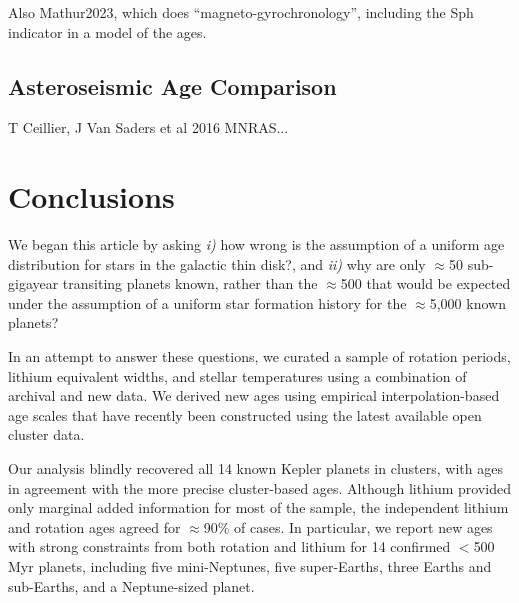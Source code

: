 \documentclass[11pt,twocolumn,tighten]{aastex63}
\begin{document}
Also Mathur2023, which does ``magneto-gyrochronology'', including the
Sph indicator in a model of the ages.


\subsection{Asteroseismic Age Comparison}
T Ceillier, J Van Saders et al 2016 MNRAS...


\section{Conclusions}
\label{sec:conclusions}

We began this article by asking {\it i)} how wrong is the assumption
of a uniform age distribution for stars in the galactic thin disk?,
and {\it ii)} why are only $\approx$50 sub-gigayear transiting planets
known, rather than the $\approx$500 that would be expected under the 
assumption of a uniform star formation history for
the $\approx$5{,}000 known planets?

In an attempt to answer these questions, we curated a sample of rotation
periods, lithium equivalent widths, and stellar temperatures using a combination
of archival and new data.
We derived new ages using empirical interpolation-based age scales
that have recently been constructed using the latest available open cluster data.

Our analysis blindly recovered all 14 known Kepler planets in
clusters, with ages in agreement with the more precise cluster-based ages.
Although lithium provided only marginal added information for most of
the sample, the independent lithium and rotation ages agreed for
$\approx$90\% of cases.  In particular, we report new ages with strong
constraints from both rotation and lithium for 14 confirmed
$<$500\,Myr planets, including five mini-Neptunes, five super-Earths,
three Earths and sub-Earths, and a Neptune-sized planet.
\end{document}
